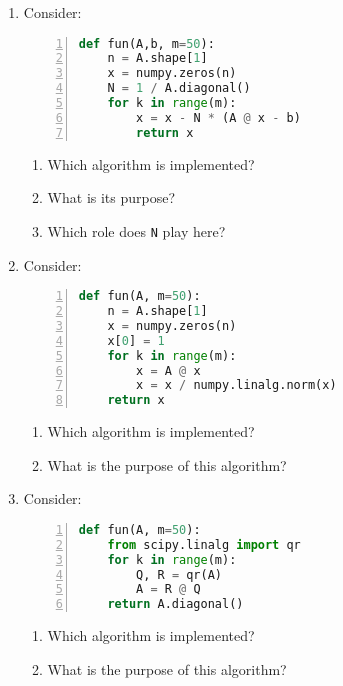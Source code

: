 \vspace*{-0.5cm}
\begin{enumerate}
	\item Consider:
\begin{lstlisting}[language=python,numbers=left]
def fun(A,b, m=50):
    n = A.shape[1]
    x = numpy.zeros(n)
    N = 1 / A.diagonal()		
    for k in range(m):
        x = x - N * (A @ x - b)
        return x
\end{lstlisting}
	\begin{enumerate}
		\item Which algorithm is implemented?
		\item What is its purpose? 
		\item Which role does \verb|N| play here?
	\end{enumerate}
\item Consider:
\begin{lstlisting}[language=python,numbers=left]
def fun(A, m=50):
    n = A.shape[1]
    x = numpy.zeros(n)
    x[0] = 1	
    for k in range(m):
        x = A @ x
        x = x / numpy.linalg.norm(x)
    return x
\end{lstlisting}
\begin{enumerate}
	\item Which algorithm is implemented? 
	\item What is the purpose of this algorithm?
\end{enumerate}
\item Consider:
\begin{lstlisting}[language=python,numbers=left]
def fun(A, m=50):
    from scipy.linalg import qr
    for k in range(m):
        Q, R = qr(A)
        A = R @ Q
    return A.diagonal()
\end{lstlisting}
\begin{enumerate}
	\item Which algorithm is implemented? 
	\item What is the purpose of this algorithm?
\end{enumerate}
\end{enumerate}
 